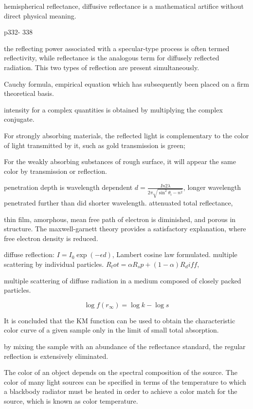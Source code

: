 \iffalse

hemispherical reflectance, 
diffusive reflectance is a mathematical artifice without direct physical meaning. 

p332- 338

the reflecting power associated with a specular-type process is often termed reflectivity, while reflectance is the analogous term for diffusely reflected radiation. This two types of reflection are present simultaneously. 

Cauchy formula, empirical equation which has subsequently been placed on a firm theoretical basis. 

intensity for a complex quantities is obtained by multiplying the complex conjugate. 

For strongly absorbing materials, the reflected light is complementary to the color of light transmitted by it, such as gold transmission is green; 

For the weakly absorbing substances of rough surface, it will appear the same color by transmission or reflection. 

penetration depth is wavelength dependent $d = \frac{In2 \lambda}{2\pi \sqrt{\sin^2\theta_i - n^2}}$, longer wavelength penetrated further than did shorter wavelength. attenuated total reflectance, 

thin film, amorphous, mean free path of electron is diminished, and porous in structure. The maxwell-garnett theory provides a satisfactory explanation, where free electron density is reduced. 

diffuse reflection: $I = I_0 \exp(-\epsilon d)$, Lambert cosine law formulated. multiple scattering by individual particles. 
$R_tot = \alpha R_sp + (1- \alpha) R_diff $, 

multiple scattering of diffuse radiation in a medium composed of closely packed particles. 

\[
\log{f(r_\infty) = \log{k} - \log{s}}
\]

It is concluded that the KM function can be used to obtain the characteristic color curve of a given sample only in the limit of small total absorption. 

by mixing the sample with an abundance of the reflectance standard, the regular reflection is extensively eliminated. 

The color of an object depends on the spectral composition of the source. The color of many light sources can be specified in terms of the temperature to which a blackbody radiator must be heated in order to achieve a color match for the source, which is known as color temperature. 

